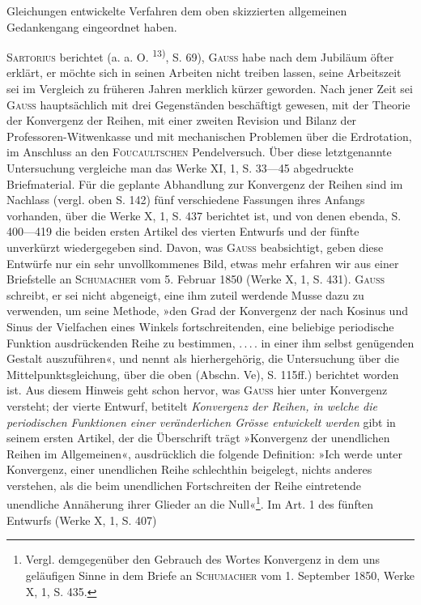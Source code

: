 \clearpage{}
\noindent Gleichungen entwickelte Verfahren dem oben skizzierten allgemeinen Gedankengang
eingeordnet haben.
\par
\textsc{Sartorius} berichtet (a. a. O. \textsuperscript{13)}, S. 69), \textsc{Gauss} habe nach dem Jubiläum öfter
erklärt, er möchte sich in seinen Arbeiten nicht treiben lassen, seine Arbeitszeit
sei im Vergleich zu früheren Jahren merklich kürzer geworden. Nach
jener Zeit sei \textsc{Gauss} hauptsächlich mit drei Gegenständen beschäftigt gewesen,
mit der Theorie der Konvergenz der Reihen, mit einer zweiten Revision und
Bilanz der Professoren-Witwenkasse und mit mechanischen Problemen über die
Erdrotation, im Anschluss an den \textsc{Foucaultschen} Pendelversuch. Über diese
letztgenannte Untersuchung vergleiche man das Werke XI, 1, S. 33—45 abgedruckte
Briefmaterial. Für die geplante Abhandlung zur Konvergenz der
Reihen sind im Nachlass (vergl. oben S. 142) fünf verschiedene Fassungen
ihres Anfangs vorhanden, über die Werke X, 1, S. 437 berichtet ist, und von
denen ebenda, S. 400—419 die beiden ersten Artikel des vierten Entwurfs
und der fünfte unverkürzt wiedergegeben sind. Davon, was \textsc{Gauss} beabsichtigt,
geben diese Entwürfe nur ein sehr unvollkommenes Bild, etwas mehr
erfahren wir aus einer Briefstelle an \textsc{Schumacher} vom 5. Februar 1850 (Werke
X, 1, S. 431). \textsc{Gauss} schreibt, er sei nicht abgeneigt, eine ihm zuteil werdende
Musse dazu zu verwenden, um seine Methode, »den Grad der Konvergenz der
nach Kosinus und Sinus der Vielfachen eines Winkels fortschreitenden, eine
beliebige periodische Funktion ausdrückenden Reihe zu bestimmen, \mbox{.\,.\,.\,.} in
einer ihm selbst genügenden Gestalt auszuführen«, und nennt als hierhergehörig,
die Untersuchung über die Mittelpunktsgleichung, über die oben
(Abschn. Ve), S. 115ff.) berichtet worden ist. Aus diesem Hinweis geht schon
hervor, was \textsc{Gauss} hier unter Konvergenz versteht; der vierte Entwurf, betitelt
\textit{Konvergenz der Reihen, in welche die periodischen Funktionen einer
veränderlichen Grösse entwickelt werden} gibt in seinem ersten Artikel, der
die Überschrift trägt »Konvergenz der unendlichen Reihen im Allgemeinen«,
ausdrücklich die folgende Definition: »Ich werde unter Konvergenz, einer
unendlichen Reihe schlechthin beigelegt, nichts anderes verstehen, als die beim
unendlichen Fortschreiten der Reihe eintretende unendliche Annäherung ihrer
Glieder an die Null«\footnote{Vergl. demgegenüber den Gebrauch des Wortes Konvergenz in dem uns geläufigen Sinne in dem Briefe an \textsc{Schumacher} vom 1. September 1850, Werke X, 1, S. 435.}. Im Art. 1 des fünften Entwurfs (Werke X, 1, S. 407)\par
